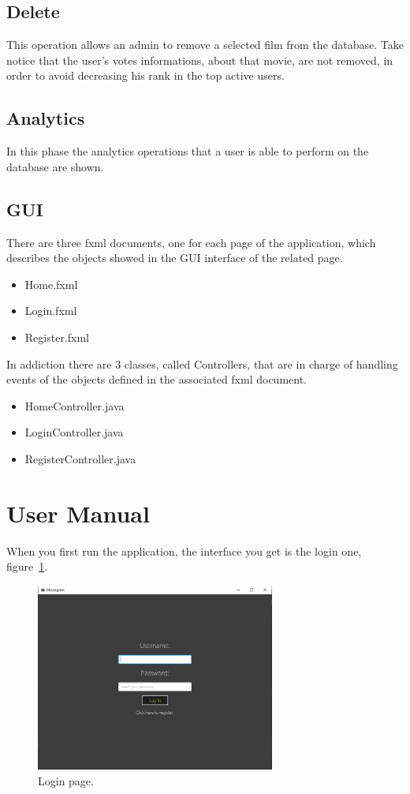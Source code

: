 \documentclass[a4paper, oneside]{article}
\begin{document}
\subsection{Delete}
This operation allows an admin to remove a selected film from the database. Take notice that the user's votes informations, about that movie, are not removed, in order to avoid decreasing his rank in the top active users.
\vspace{2mm}

\vspace{5mm}

\clearpage

\subsection{Analytics}
In this phase the analytics operations that a user is able to perform on the database are shown.

\subsection{GUI}
There are three fxml documents, one for each page of the application, which describes the objects showed in the GUI interface of the related page.
\begin{itemize}
\item Home.fxml
\item Login.fxml
\item Register.fxml
\end{itemize}
In addiction there are 3 classes, called Controllers, that are in charge of handling events of the objects defined in the associated fxml document.
\begin{itemize}
\item HomeController.java
\item LoginController.java
\item RegisterController.java
\end{itemize}

\clearpage
\section{User Manual}
When you first run the application, the interface you get is the login one, figure~\ref{fig:screen0}.
\begin{figure}[H]
\centering
\includegraphics[width=0.7\textwidth]{./images/screens/screen0} 
\caption{Login page.}
\label{fig:screen0}
\end{figure}
\end{document}
